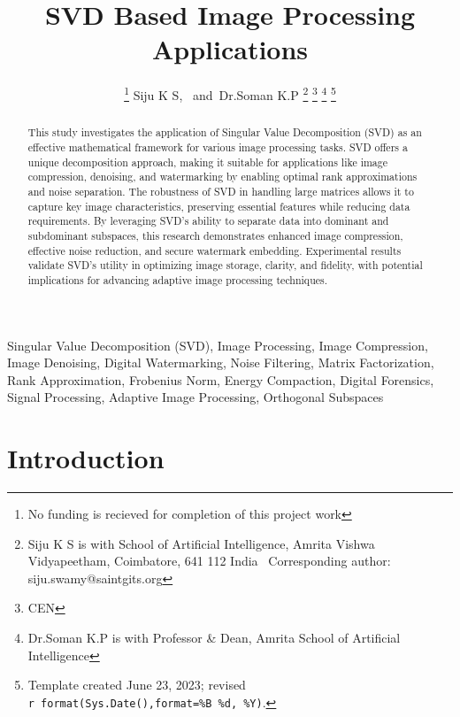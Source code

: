 \documentclass[
  journal,
]{IEEEtran}%
\title{SVD Based Image Processing Applications}
\author{
\thanks{No funding is recieved for completion of this project work}
Siju K S\orcidlink{0009-0004-1983-5574},~\IEEEmembership{Member, ISTE}
and~Dr.Soman K.P%
\thanks{Siju K S is with School of Artificial Intelligence, Amrita
Vishwa Vidyapeetham, Coimbatore, 641 112 India%
  Corresponding author: siju.swamy@saintgits.org
}
\thanks{CEN}
\thanks{Dr.Soman K.P is with Professor \& Dean, Amrita School of
Artificial Intelligence%
}
\thanks{Template created June 23, 2023; revised
\texttt{r\ format(Sys.Date(),format=\textquotesingle{}\%B\ \%d,\ \%Y\textquotesingle{})}.}
}
\begin{document}


\maketitle

\begin{abstract}
This study investigates the application of Singular Value Decomposition
(SVD) as an effective mathematical framework for various image
processing tasks. SVD offers a unique decomposition approach, making it
suitable for applications like image compression, denoising, and
watermarking by enabling optimal rank approximations and noise
separation. The robustness of SVD in handling large matrices allows it
to capture key image characteristics, preserving essential features
while reducing data requirements. By leveraging SVD's ability to
separate data into dominant and subdominant subspaces, this research
demonstrates enhanced image compression, effective noise reduction, and
secure watermark embedding. Experimental results validate SVD's utility
in optimizing image storage, clarity, and fidelity, with potential
implications for advancing adaptive image processing techniques.
\end{abstract}
\begin{IEEEkeywords}
Singular Value Decomposition (SVD), Image Processing, Image
Compression, Image Denoising, Digital Watermarking, Noise
Filtering, Matrix Factorization, Rank Approximation, Frobenius
Norm, Energy Compaction, Digital Forensics, Signal Processing, Adaptive
Image Processing, Orthogonal Subspaces
\end{IEEEkeywords}

%


\section{Introduction}\label{introduction}
\end{document}
